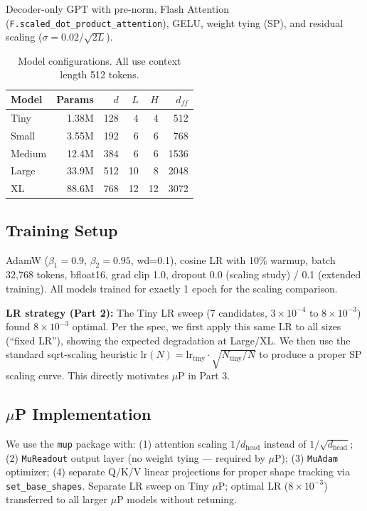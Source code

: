 \documentclass[11pt]{article}
\begin{document}
Decoder-only GPT with pre-norm, Flash Attention (\texttt{F.scaled\_dot\_product\_attention}),
GELU, weight tying (SP), and residual scaling ($\sigma = 0.02/\sqrt{2L}$).

\begin{table}[H]
\centering\small
\begin{tabular}{lrrrrr}
\toprule
Model & Params & $d$ & $L$ & $H$ & $d_{ff}$ \\
\midrule
Tiny   & 1.38M  & 128 & 4  & 4  & 512  \\
Small  & 3.55M  & 192 & 6  & 6  & 768  \\
Medium & 12.4M  & 384 & 6  & 6  & 1536 \\
Large  & 33.9M  & 512 & 10 & 8  & 2048 \\
XL     & 88.6M  & 768 & 12 & 12 & 3072 \\
\bottomrule
\end{tabular}
\caption{Model configurations. All use context length 512 tokens.}
\end{table}

\subsection{Training Setup}

AdamW ($\beta_1=0.9$, $\beta_2=0.95$, wd=0.1), cosine LR with 10\% warmup,
batch 32,768 tokens, bfloat16, grad clip 1.0, dropout 0.0 (scaling study) /
0.1 (extended training). All models trained for exactly 1 epoch for the scaling
comparison.

\textbf{LR strategy (Part 2):} The Tiny LR sweep (7 candidates, $3\times10^{-4}$ to
$8\times10^{-3}$) found $8\times10^{-3}$ optimal. Per the spec, we first apply this
same LR to all sizes (``fixed LR''), showing the expected degradation at Large/XL.
We then use the standard sqrt-scaling heuristic
$\text{lr}(N) = \text{lr}_{\text{tiny}} \cdot \sqrt{N_{\text{tiny}}/N}$
to produce a proper SP scaling curve. This directly motivates $\mu$P in Part 3.

\subsection{$\mu$P Implementation}

We use the \texttt{mup} package with: (1) attention scaling $1/d_{\text{head}}$
instead of $1/\sqrt{d_{\text{head}}}$; (2) \texttt{MuReadout} output layer (no
weight tying --- required by $\mu$P); (3) \texttt{MuAdam} optimizer; (4) separate
Q/K/V linear projections for proper shape tracking via \texttt{set\_base\_shapes}.
Separate LR sweep on Tiny $\mu$P; optimal LR ($8\times10^{-3}$) transferred
to all larger $\mu$P models without retuning.
\end{document}
